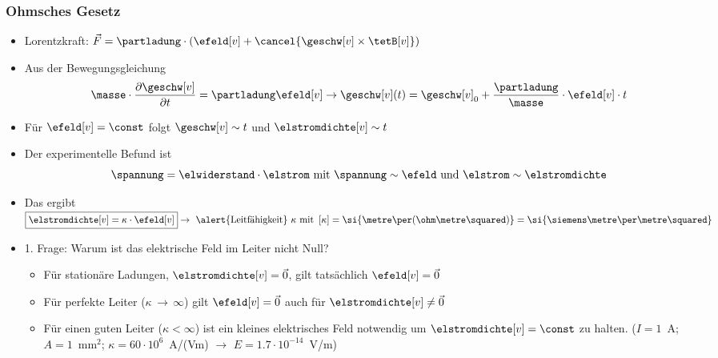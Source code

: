 \begin{frame}
  \frametitle{Ohmsches Gesetz}
\begin{itemize}[<+->]      
\item Lorentzkraft: $\vec{F} = \partladung \cdot \left( \efeld[v] + \cancel{\geschw[v] \times \tetB[v]} \right)$
\item Aus der Bewegungsgleichung
\begin{equation*}
	\masse \cdot \dfrac{\partial \geschw[v]}{\partial t} = \partladung \efeld[v] \to \geschw[v](t) = \geschw[v]_0 + \dfrac{\partladung}{\masse} \cdot \efeld[v] \cdot t
\end{equation*}
\item Für \(\efeld[v] = \const \) folgt \(\geschw[v] \sim t\) und \(\elstromdichte[v] \sim t \)
\item Der experimentelle Befund ist
\begin{equation*}
	\spannung = \elwiderstand \cdot \elstrom \text{ mit } \spannung \sim \efeld \text{ und } \elstrom \sim \elstromdichte
\end{equation*}
\item Das ergibt
$
	\boxed{\elstromdichte[v] = \kappa \cdot \efeld[v]}  \to \text{ \alert{Leitfähigkeit} }\kappa \text{ mit } \left[\kappa \right] = \si{\metre\per(\ohm\metre\squared)} = \si{\siemens\metre\per\metre\squared} 
$
\item 1. Frage: Warum ist das elektrische Feld im Leiter nicht
  Null?
  \begin{itemize}
  \item Für stationäre Ladungen, $\elstromdichte[v] = \vec{0}$, gilt tatsächlich \(\efeld[v] = \vec{0} \)
  \item Für perfekte Leiter (\(\kappa \,\rightarrow\, \infty \)) gilt \(\efeld[v] = \vec{0} \) auch für  $\elstromdichte[v] \ne \vec{0}$
   \item Für einen guten Leiter (\(\kappa < \infty \)) ist ein kleines elektrisches Feld notwendig um \(\elstromdichte[v] = \const \) zu halten. ($I=1$~A; $A=1$~mm$^2$; $\kappa=60\cdot 10^6$~A/(Vm) $\to$ $E=1.7 \cdot 10^{-14}$~V/m)
    \end{itemize} 
\end{itemize}
\end{frame}

